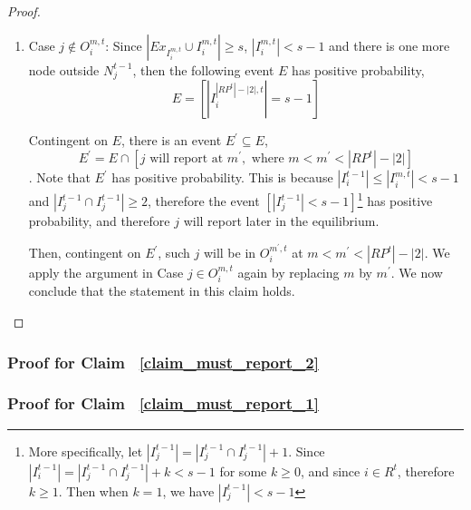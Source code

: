 \documentclass[12pt]{article}
\theoremstyle{remark}
\theoremstyle{remark}
\begin{document}
\begin{proof}
\begin{enumerate}
\item Case $j\notin O^{m,t}_i$: Since $|Ex_{I^{m,t}_i}\cup I^{m,t}_i|\geq s$, $|I^{m,t}_i|<s-1$ and there is one more node outside $N^{t-1}_j$, then the following event $E$ has positive probability,
\[E=[|I^{|RP^t|-|2|,t}_i|=s-1] \]

Contingent on $E$, there is an event $E^{'}\subseteq E$,
\[E^{'}=E \cap [  j \text{ will report at }m^{'}, \text{ where } m<m^{'}<|RP^t|-|2| ]\]
. Note that $E^{'}$ has positive probability. This is because $|I^{t-1}_i|\leq |I^{m,t}_i|<s-1$ and $|I^{t-1}_j\cap I^{t-1}_j|\geq 2$, therefore the event $[|I^{t-1}_j|<s-1]$\footnote{More specifically, let $|I^{t-1}_j|=|I^{t-1}_j\cap I^{t-1}_j|+1$. Since $|I^{t-1}_i|=|I^{t-1}_j\cap I^{t-1}_j|+k<s-1$ for some $k\geq 0$, and since $i\in R^t$, therefore $k\geq 1$. Then when $k=1$, we have $|I^{t-1}_j|<s-1$} has positive probability, and therefore $j$ will report later in the equilibrium.

Then, contingent on $E^{'}$, such $j$ will be in $O^{m^{'},t}_i$ at $m<m^{'}<|RP^t|-|2|$. We apply the argument in Case $j\in O^{m,t}_i$ again by replacing $m$ by $m^{'}$. We now conclude that the statement in this claim holds.


\end{enumerate}



\end{proof}















\subsubsection{Proof for Claim ~\ref{claim_must_report_2}}







\subsubsection{Proof for Claim ~\ref{claim_must_report_1}}
\end{document}
